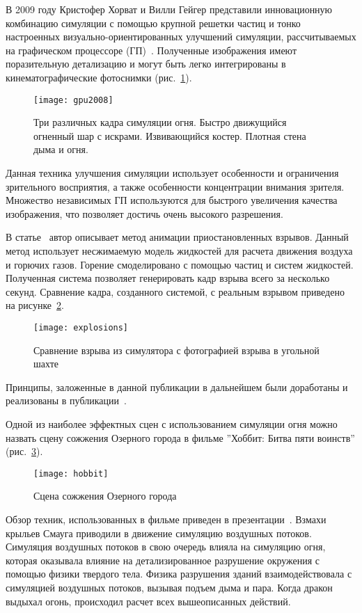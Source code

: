 В 2009 году Кристофер Хорват и Вилли Гейгер представили инновационную комбинацию
симуляции с помощью крупной решетки частиц и тонко настроенных
визуально-ориентированных улучшений симуляции, рассчитываемых на графическом
процессоре (ГП)~\cite{Stock:2008:SWF:1400385.1400457}. Полученные изображения
имеют поразительную детализацию и могут быть легко интегрированы в
кинематографические фотоснимки (рис.~\ref{fig:gpu2008}).
\begin{figure}[htb]
	\centering
	\texttt{[image: gpu2008]}
	\caption{Три различных кадра симуляции огня. Быстро движущийся огненный
	шар с искрами. Извивающийся костер. Плотная стена дыма и огня.}%
    \label{fig:gpu2008}
\end{figure}
Данная техника улучшения симуляции использует особенности и ограничения
зрительного восприятия, а также особенности концентрации внимания зрителя.
Множество независимых ГП используются для быстрого увеличения качества
изображения, что позволяет достичь очень высокого разрешения.

В статье~\cite{suspendedExplosions} автор описывает метод анимации
приостановленных взрывов. Данный метод использует несжимаемую модель жидкостей
для расчета движения воздуха и горючих газов. Горение смоделировано с помощью
частиц и систем жидкостей. Полученная система позволяет генерировать кадр взрыва
всего за несколько секунд. Сравнение кадра, созданного системой, с реальным
взрывом приведено на рисунке~\ref{fig:explosions}.
\begin{figure}[htb]
	\centering
	\texttt{[image: explosions]}
	\caption{Сравнение взрыва из симулятора с фотографией взрыва в угольной
    шахте}%
    \label{fig:explosions}
\end{figure}
Принципы, заложенные в данной публикации в дальнейшем были доработаны и
реализованы в публикации~\cite{VortexExplosions}.

Одной из наиболее эффектных сцен с использованием симуляции огня можно назвать
сцену сожжения Озерного города в фильме ''Хоббит: Битва пяти воинств''
(рис.~\ref{fig:hobbit}).
\begin{figure}[htb]
    \centering
    \texttt{[image: hobbit]}
    \caption{Сцена сожжения Озерного города}%
    \label{fig:hobbit}
\end{figure}
Обзор техник, использованных в фильме приведен в
презентации~\cite{hobbitSlides}. Взмахи крыльев Смауга приводили в движение
симуляцию воздушных потоков. Симуляция воздушных потоков в свою очередь влияла
на симуляцию огня, которая оказывала влияние на детализированное разрушение
окружения с помощью физики твердого тела. Физика разрушения зданий
взаимодействовала с симуляцией воздушных потоков, вызывая подъем дыма и пара.
Когда дракон выдыхал огонь, происходил расчет всех вышеописанных действий.


